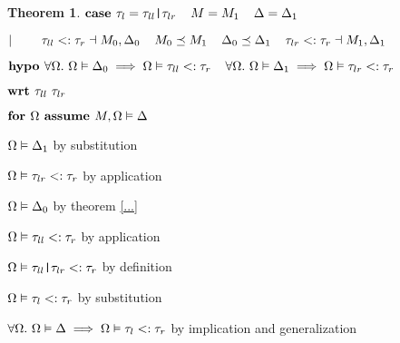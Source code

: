 \documentclass[acmsmall]{acmart}
\theoremstyle{definition}
\newtheorem{theorem}{Theorem}[section]
\begin{document}
\begin{theorem}
    \item \Z $\textbf{case } 
      \tau_l = \texttt{$\tau_{ll}$|$\tau_{lr}$}
      \hspace{4mm}
      M = M_1
      \hspace{4mm}
      \Delta = \Delta_1
    $
    \item \Z $|\ \ \ \ \ \ \ 
      \tau_{ll} <: \tau_r
      \dashv M_0, \Delta_0
      \hspace{4mm}
      M_0 \preceq M_1
      \hspace{4mm}
      \Delta_0 \preceq \Delta_1
      \hspace{4mm}
      \tau_{lr} <: \tau_r
      \dashv M_1, \Delta_1
    $

    \item \Z $\textbf{hypo } 
      \forall \Omega .\ \Omega \vDash \Delta_0 \implies \Omega \vDash \tau_{ll} <: \tau_r
      \hspace{4mm}
      \forall \Omega .\ \Omega \vDash \Delta_1 \implies \Omega \vDash \tau_{lr} <: \tau_r
    $
    \item \Z $\textbf{wrt } \tau_{ll}\ \tau_{lr}$

      \item \Z\Z $\textbf{for } \Omega \textbf{ assume } M, \Omega \vDash \Delta$
        \item \Z\Z\Z $\Omega \vDash \Delta_1$ by substitution 
        \item \Z\Z\Z $\Omega \vDash \tau_{lr} <: \tau_r$ by application 
        \item \Z\Z\Z $\Omega \vDash \Delta_0$ by theorem \ref{...}  
        \item \Z\Z\Z $\Omega \vDash \tau_{ll} <: \tau_r$ by application 
        \item \Z\Z\Z $\Omega \vDash \texttt{$\tau_{ll}$|$\tau_{lr}$} <: \tau_r$ 
        by definition
        \item \Z\Z\Z $\Omega \vDash \tau_l <: \tau_r$ 
        by substitution 

      \item \Z\Z $\forall \Omega .\ \Omega \vDash \Delta \implies \Omega \vDash \tau_l <: \tau_r$ 
      by implication and generalization


\end{theorem}
\end{document}
